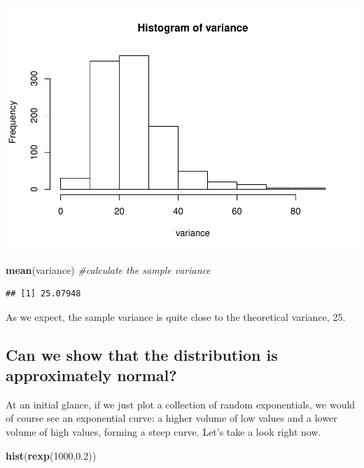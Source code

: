 \documentclass[
]{article}
\newenvironment{Shaded}{\begin{snugshade}}{\end{snugshade}}
\newcommand{\CommentTok}[1]{\textcolor[rgb]{0.56,0.35,0.01}{\textit{#1}}}
\newcommand{\DecValTok}[1]{\textcolor[rgb]{0.00,0.00,0.81}{#1}}
\newcommand{\FloatTok}[1]{\textcolor[rgb]{0.00,0.00,0.81}{#1}}
\newcommand{\KeywordTok}[1]{\textcolor[rgb]{0.13,0.29,0.53}{\textbf{#1}}}
\newcommand{\NormalTok}[1]{#1}
\begin{document}
\includegraphics{C6Project_files/figure-latex/variance-1.pdf}

\begin{Shaded}
\begin{Highlighting}[]
\KeywordTok{mean}\NormalTok{(variance) }\CommentTok{#calculate the sample variance}
\end{Highlighting}
\end{Shaded}

\begin{verbatim}
## [1] 25.07948
\end{verbatim}

As we expect, the sample variance is quite close to the theoretical
variance, 25.

\hypertarget{can-we-show-that-the-distribution-is-approximately-normal}{%
\subsection{Can we show that the distribution is approximately
normal?}\label{can-we-show-that-the-distribution-is-approximately-normal}}

At an initial glance, if we just plot a collection of random
exponentials, we would of course see an exponential curve: a higher
volume of low values and a lower volume of high values, forming a steep
curve. Let's take a look right now.

\begin{Shaded}
\begin{Highlighting}[]
\KeywordTok{hist}\NormalTok{(}\KeywordTok{rexp}\NormalTok{(}\DecValTok{1000}\NormalTok{,}\FloatTok{0.2}\NormalTok{))}
\end{Highlighting}
\end{Shaded}
\end{document}
